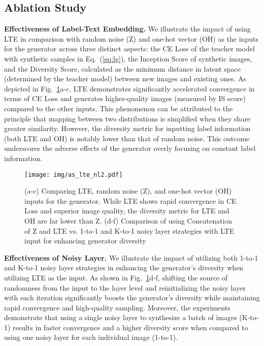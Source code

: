 \documentclass{article} %
\begin{document}
\subsection{Ablation Study}
\noindent
\textbf{Effectiveness of Label-Text Embedding.} We illustrate the impact of using LTE in comparison with random noise (Z) and one-hot vector (OH) as the inputs for the generator across three distinct aspects: the CE Loss of the teacher model with synthetic samples in Eq.~(\ref{eq:lg}), the Inception Score \citep{is} of synthetic images, and the Diversity Score, calculated as the minimum distance in latent space (determined by the teacher model) between new images and existing ones. As depicted in Fig.~\ref{fig:as_nl_lte}a-c, LTE demonstrates significantly accelerated convergence in terms of CE Loss and generates higher-quality images (measured by IS score) compared to the other inputs. This phenomenon can be attributed to the principle that mapping between two distributions is simplified when they share greater similarity. However, the diversity metric for inputting label information (both LTE and OH) is notably lower than that of random noise. This outcome underscores the adverse effects of the generator overly focusing on constant label information.

\begin{figure}[t]
\begin{center}
\texttt{[image: img/as\_lte\_nl2.pdf]}
\end{center}
\caption{(a-c) Comparing LTE, random noise (Z), and one-hot vector (OH) inputs for the generator. While LTE shows rapid convergence in CE Loss and superior image quality, the diversity metric for LTE and OH are far lower than Z. (d-f) Comparison of using Concatenation of Z and LTE vs. 1-to-1 and K-to-1 noisy layer strategies with LTE input for enhancing generator diversity}
\label{fig:as_nl_lte}
\end{figure}

\noindent
\textbf{Effectiveness of Noisy Layer.} We illustrate the impact of utilizing both 1-to-1 and K-to-1 noisy layer strategies in enhancing the generator's diversity when utilizing LTE as the input. As shown in Fig.~\ref{fig:as_nl_lte}d-f, shifting the source of randomness from the input to the layer level and reinitializing the noisy layer with each iteration significantly boosts the generator's diversity while maintaining rapid convergence and high-quality sampling. Moreover, the experiments demonstrate that using a single noisy layer to synthesize a batch of images (K-to-1) results in faster convergence and a higher diversity score when compared to using one noisy layer for each individual image (1-to-1).
\end{document}
